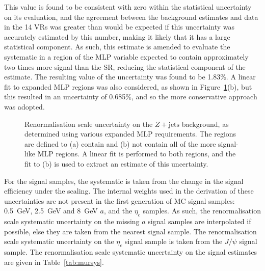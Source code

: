 \documentclass[NOTE, atlasdraft=true, texlive=2017, UKenglish]{\ATLASLATEXPATH atlasdoc}
\begin{document}
This value is found to be consistent with zero within the statistical uncertainty on its evaluation, and the agreement between the background estimates and data in the 14 VRs was greater than would be expected if this uncertainty was accurately estimated by this number, making it likely that it has a large statistical component. As such, this estimate is amended to evaluate the systematic in a region of the MLP variable expected to contain approximately two times more signal than the SR, reducing the statistical component of the estimate. The resulting value of the uncertainty was found to be 1.83\%. A linear fit to expanded MLP regions was also considered, as shown in Figure~\ref{fig:bkgdmodelmur}(b), but this resulted in an uncertainty of 0.685\%, and so the more conservative approach was adopted.

\begin{figure}[!htbp]
  \centering
  \caption{Renormalisation scale uncertainty on the $Z+\text{jets}$ background, as determined using various expanded MLP requirements. The regions are defined to (a) contain and (b) not contain all of the more signal-like MLP regions. A linear fit is performed to both regions, and the fit to (b) is used to extract an estimate of this uncertainty.}
  \label{fig:bkgdmodelmur}
\end{figure}

For the signal samples, the systematic is taken from the change in the signal efficiency under the scaling. The internal weights used in the derivation of these uncertainties are not present in the first generation of MC signal samples: 0.5~GeV, 2.5~GeV and 8~GeV $a$, and the $\eta_c$ samples. As such, the renormalisation scale systematic uncertainty on the missing $a$ signal samples are interpolated if possible, else they are taken from the nearest signal sample. The renormalisation scale systematic uncertainty on the $\eta_c$ signal sample is taken from the $J/\psi$ signal sample. The renormalisation scale systematic uncertainty on the signal estimates are given in Table~\ref{tab:mursys}.%
\end{document}
